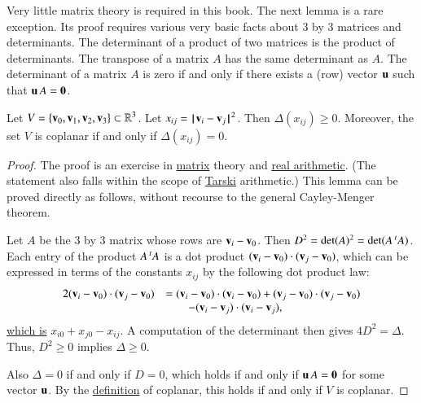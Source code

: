 \begin{background}\label{back:matrix}
  Very little matrix theory is required in this book.  The next lemma
  is a rare exception.  Its proof requires various very basic facts
  about $3$ by $3$ matrices and determinants.  The determinant of a
  product of two matrices is the product of determinants.  The
  transpose of a matrix $A$ has the same determinant as $A$.  The
  determinant of a matrix $A$ is zero if and only if there exists a
  (row) vector ${\mathbf u}$ such that ${\mathbf u}\, A = {\mathbf 0}$.
\end{background}

\begin{lemma}[]\label{lemma:delta-pos}
  Let $V=\{{\mathbf v}_0,{\mathbf v}_1,{\mathbf v}_2,{\mathbf v}_3\}\subset\mathbb{R}^3$.  Let $x_{ij} =
  \norm{\v_i}{\v_j}^2$.  Then $\Delta(x_{ij})\ge 0$.  Moreover, the
  set $V$ is coplanar if and only if $\Delta(x_{ij}) = 0$.%
\end{lemma}

\begin{proof} The proof is an exercise in
  \hyperref[back:matrix]{matrix} theory and
  \hyperref[back:analysis]{real arithmetic}.  (The statement also
  falls within the scope of \hyperref[back:tarski]{Tarski}
  arithmetic.)  This lemma can be proved directly as follows, without
  recourse to the general Cayley-Menger theorem.

  Let $A$ be the $3$ by $3$ matrix whose rows are ${\mathbf v}_i - {\mathbf v}_0$.  Then
  $D^2 = \det(A)^2 = \det(A \,\hbox{}^t A)$.  Each entry of the
  product $A\,\hbox{}^tA$ is a dot product $({\mathbf v}_i-{\mathbf v}_0)\cdot
  ({\mathbf v}_j-{\mathbf v}_0)$, which can be expressed in terms of the constants
  $x_{ij}$ by the following dot product law:
\begin{equation}\label{eqn:dot-law}
\begin{array}{lll}
  2 ({\mathbf v}_i-{\mathbf v}_0)\cdot ({\mathbf v}_j-{\mathbf v}_0) 
&= ({\mathbf v}_i-{\mathbf v}_0)\cdot({\mathbf v}_i-{\mathbf v}_0) + ({\mathbf v}_j-{\mathbf v}_0)\cdot ({\mathbf v}_j-{\mathbf v}_0) \\
  &\qquad - ({\mathbf v}_i-{\mathbf v}_j)\cdot ({\mathbf v}_i-{\mathbf v}_j),
\end{array}
\end{equation}
\hyperref[def:norm]{which is} $x_{i0} + x_{j0} - x_{ij}$.
A computation of the determinant then gives $4D^2=\Delta$.
Thus, $D^2\ge0$ implies $\Delta\ge 0$.

Also $\Delta=0$ if and only if $D=0$, which holds if and only if ${\mathbf u}\,
A = {\mathbf 0}$ for some vector ${\mathbf u}$.  By the
\hyperref[def:plane]{definition} of coplanar, this holds if and only
if $V$ is coplanar.
\end{proof}


